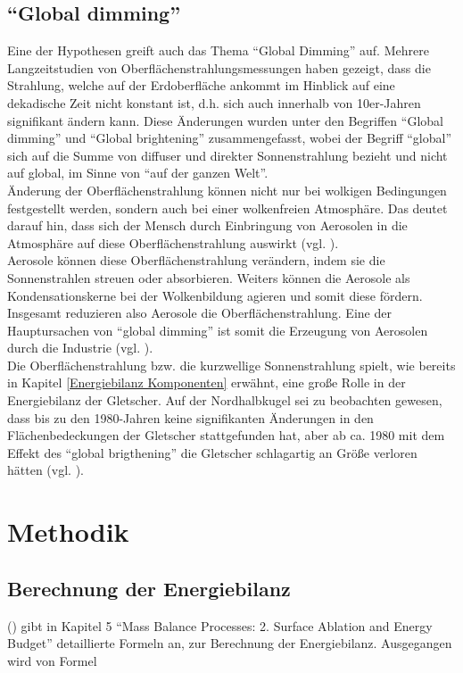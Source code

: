\documentclass[12pt,a4paper]{article}
\begin{document}
\subsection{``Global dimming''}
Eine der Hypothesen greift auch das Thema ``Global Dimming'' auf. Mehrere Langzeitstudien von Oberflächenstrahlungsmessungen haben gezeigt, dass die Strahlung, welche auf der Erdoberfläche ankommt im Hinblick auf eine dekadische Zeit nicht konstant ist, d.h. sich auch innerhalb von 10er-Jahren signifikant ändern kann. Diese Änderungen wurden unter den Begriffen ``Global dimming'' und ``Global brightening'' zusammengefasst, wobei der Begriff ``global'' sich auf die Summe von diffuser und direkter Sonnenstrahlung bezieht und nicht auf global, im Sinne von ``auf der ganzen Welt''.\\
Änderung der Oberflächenstrahlung können nicht nur bei wolkigen Bedingungen festgestellt werden, sondern auch bei einer wolkenfreien Atmosphäre. Das deutet darauf hin, dass sich der Mensch durch Einbringung von Aerosolen in die Atmosphäre auf diese Oberflächenstrahlung auswirkt (vgl. \cite[1]{GlobalDimming}).\\
Aerosole können diese Oberflächenstrahlung verändern, indem sie die Sonnenstrahlen streuen oder absorbieren. Weiters können die Aerosole als Kondensationskerne bei der Wolkenbildung agieren und somit diese fördern. Insgesamt reduzieren also Aerosole die Oberflächenstrahlung. Eine der Hauptursachen von ``global dimming'' ist somit die Erzeugung von Aerosolen durch die Industrie (vgl. \cite[14]{GlobalDimming}).\\ 
Die Oberflächenstrahlung bzw. die kurzwellige Sonnenstrahlung spielt, wie bereits in Kapitel \ref{Energiebilanz Komponenten} erwähnt, eine große Rolle in der Energiebilanz der Gletscher. Auf der Nordhalbkugel sei zu beobachten gewesen, dass bis zu den 1980-Jahren keine signifikanten Änderungen in den Flächenbedeckungen der Gletscher stattgefunden hat, aber ab ca. 1980 mit dem Effekt des ``global brigthening'' die Gletscher schlagartig an Größe verloren hätten (vgl. \cite[24]{GlobalDimming}).


\pagebreak
\section{Methodik}
\subsection{Berechnung der Energiebilanz}
\citeauthor{ThePhysicsOfGlaciers} (\citeyear{ThePhysicsOfGlaciers}) gibt in Kapitel 5 ``Mass Balance Processes: 2. Surface Ablation and Energy Budget'' detaillierte Formeln an, zur Berechnung der Energiebilanz. Ausgegangen wird von Formel 
\end{document}
